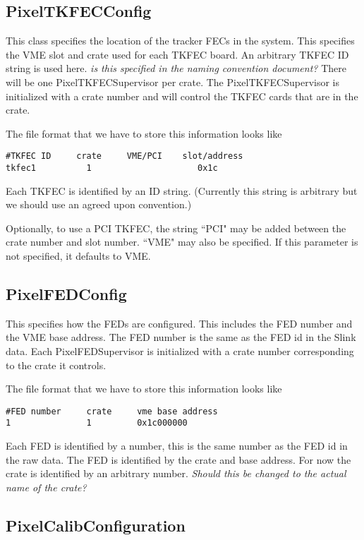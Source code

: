 \subsection{PixelTKFECConfig}

This class specifies the location of the tracker FECs in
the system. This
specifies the VME slot and crate used for each TKFEC board. An arbitrary TKFEC
ID string is used here. {\it is this specified in the naming
convention document?}
There will be one PixelTKFECSupervisor per crate. 
The PixelTKFECSupervisor is initialized
with a crate number and will control the TKFEC cards that are 
in the crate.

The file format that we have to store this information looks like
\begin{verbatim}
#TKFEC ID     crate     VME/PCI    slot/address
tkfec1          1                     0x1c
\end{verbatim}
Each TKFEC is identified by an ID string. (Currently this string
is arbitrary but we should use an agreed upon convention.)

Optionally, to use a PCI TKFEC, the string ``PCI" may be added between
the crate number and slot number.  ``VME" may also be specified.  If this
parameter is not specified, it defaults to VME.


\subsection{PixelFEDConfig}

This specifies how the FEDs are configured. This includes the FED
number and the VME base address. The FED number is the same as
the FED id in the Slink data. Each PixelFEDSupervisor is initialized
with a crate number corresponding to the crate it controls.

The file format that we have to store this information looks like
\begin{verbatim}
#FED number     crate     vme base address
1               1         0x1c000000
\end{verbatim}
Each FED is identified by a number, this is the same number as 
the FED id in the raw data. The FED is identified by the 
crate and base address. For now the crate is identified by an
arbitrary number. {\it Should this be changed to the 
actual name of the crate?}




\subsection{PixelCalibConfiguration}

